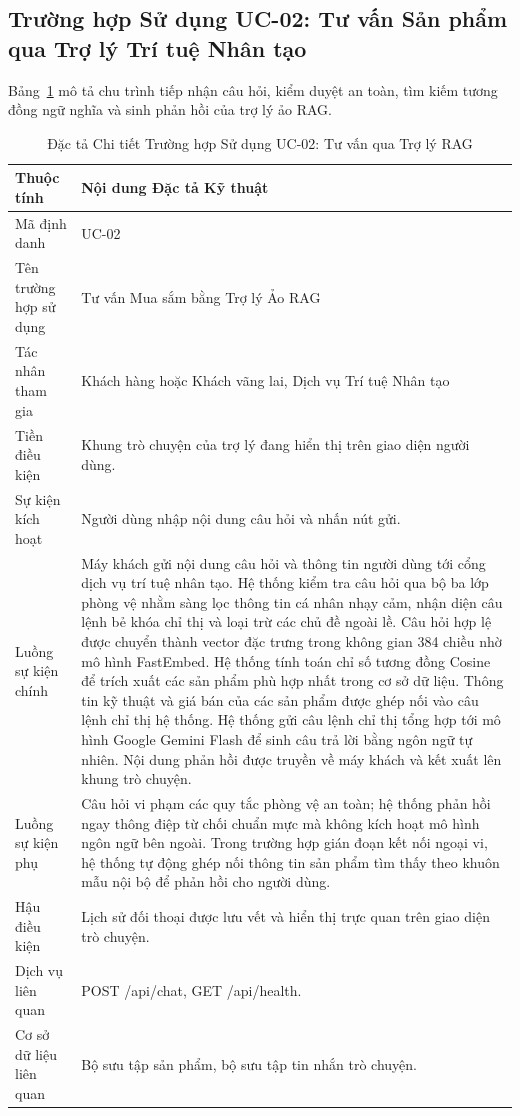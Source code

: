 \subsection{Trường hợp Sử dụng UC-02: Tư vấn Sản phẩm qua Trợ lý Trí tuệ Nhân tạo}
Bảng~\ref{tab:uc02} mô tả chu trình tiếp nhận câu hỏi, kiểm duyệt an toàn, tìm kiếm tương đồng ngữ nghĩa và sinh phản hồi của trợ lý ảo RAG.

\begin{table}[H]
\centering
\caption{Đặc tả Chi tiết Trường hợp Sử dụng UC-02: Tư vấn qua Trợ lý RAG}
\label{tab:uc02}
\begin{tabularx}{\textwidth}{p{3.5cm}X}
\toprule
\textbf{Thuộc tính} & \textbf{Nội dung Đặc tả Kỹ thuật} \\
\midrule
Mã định danh & UC-02 \\
Tên trường hợp sử dụng & Tư vấn Mua sắm bằng Trợ lý Ảo RAG \\
Tác nhân tham gia & Khách hàng hoặc Khách vãng lai, Dịch vụ Trí tuệ Nhân tạo \\
Tiền điều kiện & Khung trò chuyện của trợ lý đang hiển thị trên giao diện người dùng. \\
Sự kiện kích hoạt & Người dùng nhập nội dung câu hỏi và nhấn nút gửi. \\
Luồng sự kiện chính & 
Máy khách gửi nội dung câu hỏi và thông tin người dùng tới cổng dịch vụ trí tuệ nhân tạo.
Hệ thống kiểm tra câu hỏi qua bộ ba lớp phòng vệ nhằm sàng lọc thông tin cá nhân nhạy cảm, nhận diện câu lệnh bẻ khóa chỉ thị và loại trừ các chủ đề ngoài lề.
Câu hỏi hợp lệ được chuyển thành vector đặc trưng trong không gian 384 chiều nhờ mô hình FastEmbed.
Hệ thống tính toán chỉ số tương đồng Cosine để trích xuất các sản phẩm phù hợp nhất trong cơ sở dữ liệu.
Thông tin kỹ thuật và giá bán của các sản phẩm được ghép nối vào câu lệnh chỉ thị hệ thống.
Hệ thống gửi câu lệnh chỉ thị tổng hợp tới mô hình Google Gemini Flash để sinh câu trả lời bằng ngôn ngữ tự nhiên.
Nội dung phản hồi được truyền về máy khách và kết xuất lên khung trò chuyện. \\
Luồng sự kiện phụ & Câu hỏi vi phạm các quy tắc phòng vệ an toàn; hệ thống phản hồi ngay thông điệp từ chối chuẩn mực mà không kích hoạt mô hình ngôn ngữ bên ngoài. Trong trường hợp gián đoạn kết nối ngoại vi, hệ thống tự động ghép nối thông tin sản phẩm tìm thấy theo khuôn mẫu nội bộ để phản hồi cho người dùng. \\
Hậu điều kiện & Lịch sử đối thoại được lưu vết và hiển thị trực quan trên giao diện trò chuyện. \\
Dịch vụ liên quan & POST /api/chat, GET /api/health. \\
Cơ sở dữ liệu liên quan & Bộ sưu tập sản phẩm, bộ sưu tập tin nhắn trò chuyện. \\
\bottomrule
\end{tabularx}
\end{table}

